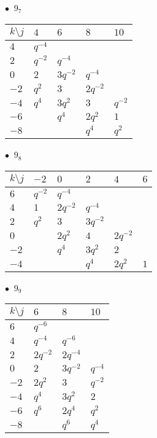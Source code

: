 %
\begin{minipage}{\linewidth}
$\bullet\ $ $9_{7}$ \vspace{0.5em} \\
\begin{tabular}{l|llll}
$k \setminus j$ & $4$ & $6$ & $8$ & $10$ \\
\hline
$4$ & $q^{-4}$ &  &  &  \\
$2$ & $q^{-2}$ & $q^{-4}$ &  &  \\
$0$ & $2$ & $3q^{-2}$ & $q^{-4}$ &  \\
$-2$ & $q^{2}$ & $3$ & $2q^{-2}$ &  \\
$-4$ & $q^{4}$ & $3q^{2}$ & $3$ & $q^{-2}$ \\
$-6$ &  & $q^{4}$ & $2q^{2}$ & $1$ \\
$-8$ &  &  & $q^{4}$ & $q^{2}$ \\
\end{tabular}
\vspace{2em}
\end{minipage}
%
\begin{minipage}{\linewidth}
$\bullet\ $ $9_{8}$ \vspace{0.5em} \\
\begin{tabular}{l|lllll}
$k \setminus j$ & $-2$ & $0$ & $2$ & $4$ & $6$ \\
\hline
$6$ & $q^{-2}$ & $q^{-4}$ &  &  &  \\
$4$ & $1$ & $2q^{-2}$ & $q^{-4}$ &  &  \\
$2$ & $q^{2}$ & $3$ & $3q^{-2}$ &  &  \\
$0$ &  & $2q^{2}$ & $4$ & $2q^{-2}$ &  \\
$-2$ &  & $q^{4}$ & $3q^{2}$ & $2$ &  \\
$-4$ &  &  & $q^{4}$ & $2q^{2}$ & $1$ \\
\end{tabular}
\vspace{2em}
\end{minipage}
%
\begin{minipage}{\linewidth}
$\bullet\ $ $9_{9}$ \vspace{0.5em} \\
\begin{tabular}{l|lll}
$k \setminus j$ & $6$ & $8$ & $10$ \\
\hline
$6$ & $q^{-6}$ &  &  \\
$4$ & $q^{-4}$ & $q^{-6}$ &  \\
$2$ & $2q^{-2}$ & $2q^{-4}$ &  \\
$0$ & $2$ & $3q^{-2}$ & $q^{-4}$ \\
$-2$ & $2q^{2}$ & $3$ & $q^{-2}$ \\
$-4$ & $q^{4}$ & $3q^{2}$ & $2$ \\
$-6$ & $q^{6}$ & $2q^{4}$ & $q^{2}$ \\
$-8$ &  & $q^{6}$ & $q^{4}$ \\
\end{tabular}
\vspace{2em}
\end{minipage}
